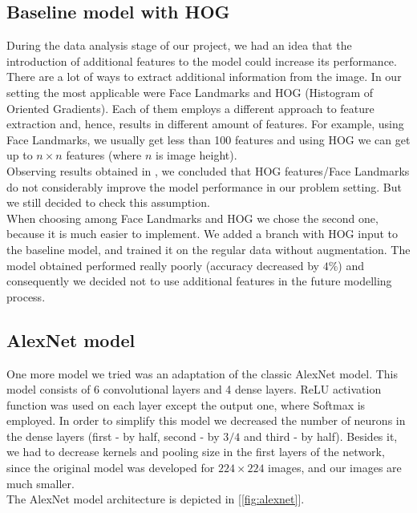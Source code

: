 \subsection{Baseline model with HOG}

During the data analysis stage of our project, we had an idea that the introduction of additional features to the model could increase its performance. There are a lot of ways to extract additional information from the image. In our setting the most applicable were Face Landmarks and HOG (Histogram of Oriented Gradients). Each of them employs a different approach to feature extraction and, hence, results in different amount of features. For example, using Face Landmarks, we usually get less than 100 features and using HOG we can get up to $n\times n$ features (where $n$ is image height).\\

Observing results obtained in \cite{githubHOG}, we concluded that HOG features/Face Landmarks do not considerably improve the model performance in our problem setting. But we still decided to check this assumption.\\

When choosing among Face Landmarks and HOG we chose the second one, because it is much easier to implement. We added a branch with HOG input to the baseline model, and trained it on the regular data without augmentation. The model obtained performed really poorly (accuracy decreased by $4\%$) and consequently we decided not to use additional features in the future modelling process.

\subsection{AlexNet model}

One more model we tried was an adaptation of the classic AlexNet model. This model consists of 6 convolutional layers and 4 dense layers. ReLU activation function was used on each layer except the output one, where Softmax is employed. In order to simplify this model we decreased the number of neurons in the dense layers (first - by half, second - by $3/4$ and third - by half). Besides it, we had to decrease kernels and pooling size in the first layers of the network, since the original model was developed for $224\times 224$ images, and our images are much smaller.\\

The AlexNet model architecture is depicted in [\ref{fig:alexnet}].\\

